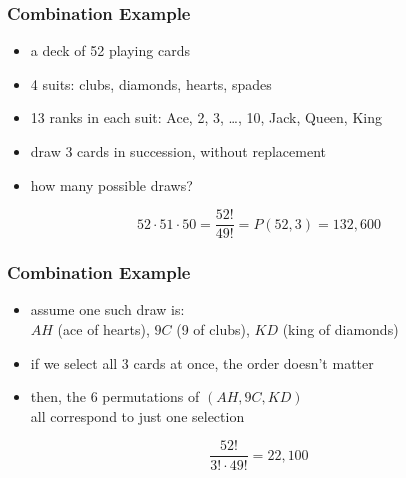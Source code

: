 \documentclass[dvipsnames]{beamer}
\begin{document}

\begin{frame}
  \frametitle{Combination Example}

  \begin{example}
    \begin{itemize}
      \item a deck of 52 playing cards
      \item 4 suits: clubs, diamonds, hearts, spades
      \item 13 ranks in each suit: Ace, 2, 3, \ldots, 10, Jack, Queen, King
      \item draw 3 cards in succession, without replacement
      \item how many possible draws?
    \end{itemize}

    \pause
    \begin{equation*}
      52 \cdot 51 \cdot 50 = \frac{52!}{49!} = P(52,3) = 132,600
    \end{equation*}  
  \end{example}
\end{frame}

\begin{frame}
  \frametitle{Combination Example}

  \begin{example}
    \begin{itemize}
      \item assume one such draw is:\\
        $AH$ (ace of hearts), $9C$ (9 of clubs), $KD$ (king of diamonds)
      \item if we select all 3 cards at once, the order doesn't matter

      \pause
      \item then, the 6 permutations of $(AH,9C,KD)$\\
        all correspond to just one selection
    \end{itemize}
    \begin{equation*}
      \frac{52!}{3! \cdot 49!} = 22,100
    \end{equation*}  
  \end{example}
\end{frame}
\end{document}
